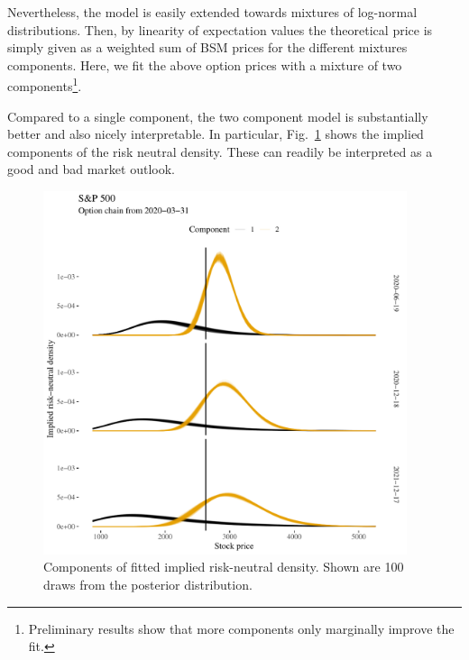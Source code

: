 \documentclass[a4paper]{tufte-handout}
\newcommand{\fig}[1]{Fig.~\ref{fig:#1}}
\begin{document}
Nevertheless, the model is easily extended towards mixtures of
log-normal distributions. Then, by linearity of expectation values the
theoretical price is simply given as a weighted sum of BSM prices for
the different mixtures components. Here, we fit the above option
prices with a mixture of two components\footnote{Preliminary results
  show that more components only marginally improve the fit.}.

Compared to a single component, the two component model is
substantially better and also nicely interpretable. In particular,
\fig{riskneutral} shows the implied components of the risk neutral
density. These can readily be interpreted as a good and bad market
outlook.
\begin{figure}
  \begin{center}
    \includegraphics[width=0.95\textwidth]{../figs/risk_neutral.pdf}
  \end{center}
  \caption{\label{fig:riskneutral} Components of fitted implied
    risk-neutral density. Shown are 100 draws from the posterior
    distribution.}
\end{figure}
\end{document}
